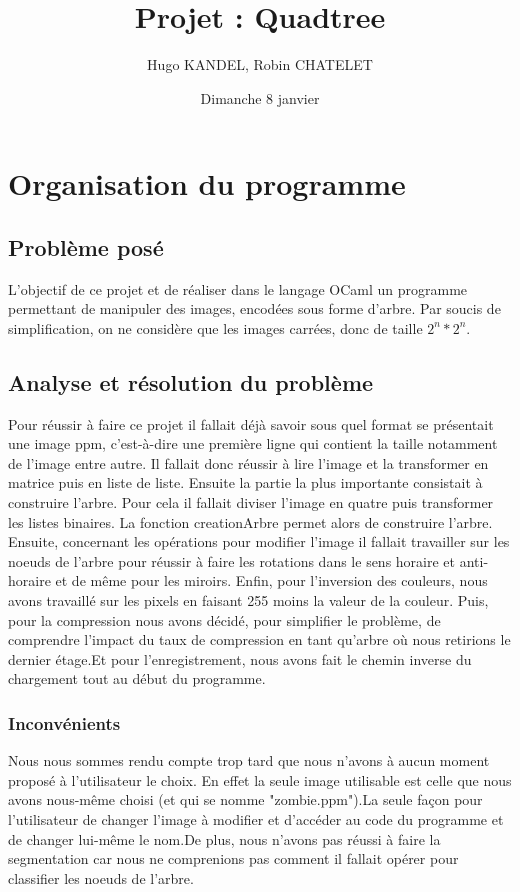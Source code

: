 \documentclass[12pt,a4paper]{article}
\title{Projet : Quadtree}
\author{Hugo KANDEL, Robin CHATELET}
\date{Dimanche 8 janvier}
\begin{document}
\maketitle
\pagebreak
\newpage
\tableofcontents
\pagebreak
\newpage

\section{Organisation du programme}
\subsection{Problème posé}
L'objectif de ce projet et de réaliser dans le langage OCaml un programme permettant de manipuler des images, encodées sous forme d’arbre. Par soucis de simplification, on ne considère que les images carrées, donc de taille $2^n * 2^n$.

\subsection{Analyse et résolution du problème} 
Pour réussir à faire ce projet il fallait déjà savoir sous quel format se présentait une image ppm, c'est-à-dire une première ligne qui contient la taille notamment de l'image entre autre. Il fallait donc réussir à lire l'image et la transformer en matrice puis en liste de liste. \newline Ensuite la partie la plus importante consistait à construire l'arbre. Pour cela il fallait diviser l'image en quatre puis transformer les listes binaires. La fonction creationArbre permet alors de construire l'arbre. Ensuite, concernant les opérations pour modifier l'image il fallait travailler sur les noeuds de l'arbre pour réussir à faire les rotations dans le sens horaire et anti-horaire et de même pour les miroirs. \newline Enfin, pour l'inversion des couleurs, nous avons travaillé sur les pixels en faisant 255 moins la valeur de la couleur. Puis, pour la compression nous avons décidé, pour simplifier le problème, de comprendre l'impact du taux de compression en tant qu'arbre où nous retirions le dernier étage.\newline Et pour l'enregistrement, nous avons fait le chemin inverse du chargement tout au début du programme.

\subsubsection{Inconvénients}
Nous nous sommes rendu compte trop tard que nous n'avons à aucun moment proposé à l'utilisateur le choix. En effet la seule image utilisable est celle que nous avons nous-même choisi (et qui se nomme "zombie.ppm").\newline La seule façon pour l'utilisateur de changer l'image à modifier et d'accéder au code du programme et de changer lui-même le nom.\newline De plus, nous n'avons pas réussi à faire la segmentation car nous ne comprenions pas comment il fallait opérer pour classifier les noeuds de l'arbre. 
\end{document}
